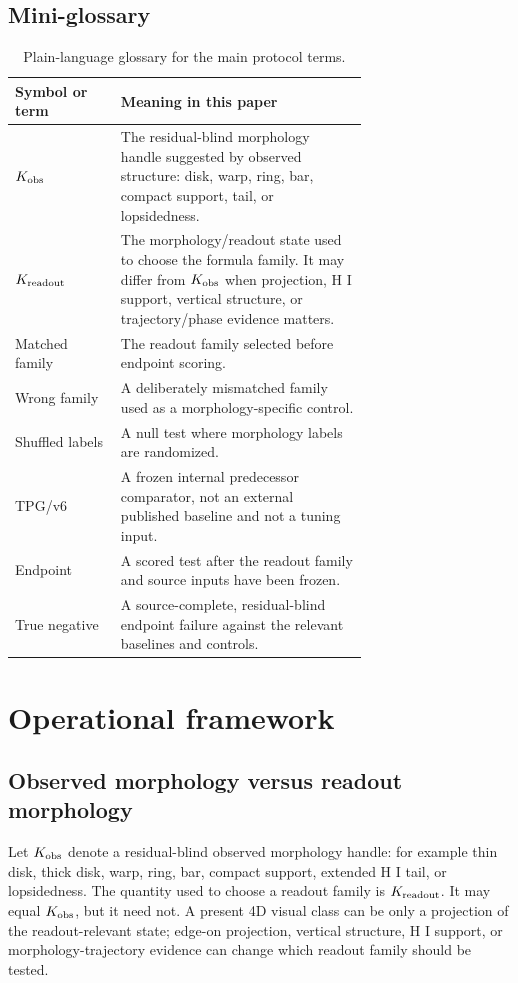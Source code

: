 \documentclass[11pt]{article}
\begin{document}
\subsection{Mini-glossary}

\begin{table}[H]
\centering
\caption{Plain-language glossary for the main protocol terms.}
\small
\begin{tabular}{lp{0.70\linewidth}}
\toprule
Symbol or term & Meaning in this paper\\
\midrule
\(K_{\rm obs}\) & The residual-blind morphology handle suggested by observed
structure: disk, warp, ring, bar, compact support, tail, or lopsidedness.\\
\(K_{\rm readout}\) & The morphology/readout state used to choose the formula
family.  It may differ from \(K_{\rm obs}\) when projection, H I support,
vertical structure, or trajectory/phase evidence matters.\\
Matched family & The readout family selected before endpoint scoring.\\
Wrong family & A deliberately mismatched family used as a morphology-specific
control.\\
Shuffled labels & A null test where morphology labels are randomized.\\
TPG/v6 & A frozen internal predecessor comparator, not an external published
baseline and not a tuning input.\\
Endpoint & A scored test after the readout family and source inputs have been
frozen.\\
True negative & A source-complete, residual-blind endpoint failure against the
relevant baselines and controls.\\
\bottomrule
\end{tabular}
\end{table}

\section{Operational framework}

\subsection{Observed morphology versus readout morphology}

Let \(K_{\rm obs}\) denote a residual-blind observed morphology handle: for
example thin disk, thick disk, warp, ring, bar, compact support, extended H I
tail, or lopsidedness.  The quantity used to choose a readout family is
\(K_{\rm readout}\).  It may equal \(K_{\rm obs}\), but it need not.  A present
4D visual class can be only a projection of the readout-relevant state; edge-on
projection, vertical structure, H I support, or morphology-trajectory evidence can
change which readout family should be tested.
\end{document}
